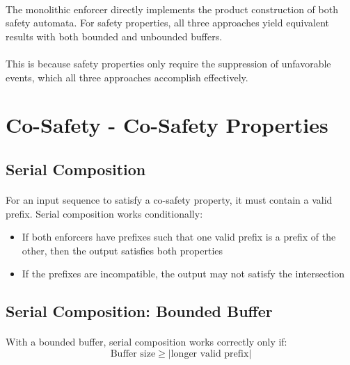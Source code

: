 \paragraph{}
The monolithic enforcer directly implements the product construction of both safety automata. For safety properties, all three approaches yield equivalent results with both bounded and unbounded buffers.

\paragraph{}
This is because safety properties only require the suppression of unfavorable events, which all three approaches accomplish effectively.

\section{Co-Safety - Co-Safety Properties}

\subsection{Serial Composition}
\paragraph{}
For an input sequence to satisfy a co-safety property, it must contain a valid prefix. Serial composition works conditionally:
\begin{itemize}
    \item If both enforcers have prefixes such that one valid prefix is a prefix of the other, then the output satisfies both properties
    \item If the prefixes are incompatible, the output may not satisfy the intersection
\end{itemize}

\subsection{Serial Composition: Bounded Buffer}
\paragraph{}
With a bounded buffer, serial composition works correctly only if:
\[
\text{Buffer size} \geq |\text{longer valid prefix}|
\]

